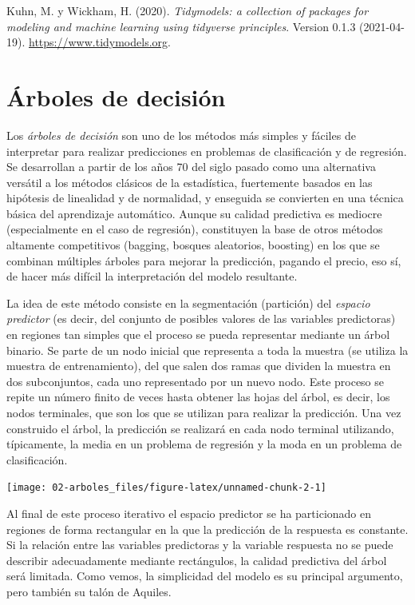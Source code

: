 \documentclass[
]{book}
\theoremstyle{break}
\theoremstyle{definition}
\theoremstyle{definition}
\theoremstyle{definition}
\theoremstyle{definition}
\theoremstyle{remark}
\begin{document}
Kuhn, M. y Wickham, H. (2020). \emph{Tidymodels: a collection of packages for modeling and machine learning using tidyverse principles}. Version 0.1.3 (2021-04-19). \url{https://www.tidymodels.org}.

\hypertarget{trees}{%
\chapter{Árboles de decisión}\label{trees}}

Los \emph{árboles de decisión} son uno de los métodos más simples y fáciles de interpretar para realizar predicciones en problemas de clasificación y de regresión.
Se desarrollan a partir de los años 70 del siglo pasado como una alternativa versátil a los métodos clásicos de la estadística, fuertemente basados en las hipótesis de linealidad y de normalidad, y enseguida se convierten en una técnica básica del aprendizaje automático.
Aunque su calidad predictiva es mediocre (especialmente en el caso de regresión), constituyen la base de otros métodos altamente competitivos (bagging, bosques aleatorios, boosting) en los que se combinan múltiples árboles para mejorar la predicción, pagando el precio, eso sí, de hacer más difícil la interpretación del modelo resultante.

La idea de este método consiste en la segmentación (partición) del \emph{espacio predictor} (es decir, del conjunto de posibles valores de las variables predictoras) en regiones tan simples que el proceso se pueda representar mediante un árbol binario.
Se parte de un nodo inicial que representa a toda la muestra (se utiliza la muestra de entrenamiento), del que salen dos ramas que dividen la muestra en dos subconjuntos, cada uno representado por un nuevo nodo.
Este proceso se repite un número finito de veces hasta obtener las hojas del árbol, es decir, los nodos terminales, que son los que se utilizan para realizar la predicción.
Una vez construido el árbol, la predicción se realizará en cada nodo terminal utilizando, típicamente, la media en un problema de regresión y la moda en un problema de clasificación.

\begin{center}\texttt{[image: 02-arboles\_files/figure-latex/unnamed-chunk-2-1]} \end{center}

Al final de este proceso iterativo el espacio predictor se ha particionado en regiones de forma rectangular en la que la predicción de la respuesta es constante.
Si la relación entre las variables predictoras y la variable respuesta no se puede describir adecuadamente mediante rectángulos, la calidad predictiva del árbol será limitada.
Como vemos, la simplicidad del modelo es su principal argumento, pero también su talón de Aquiles.
\end{document}
